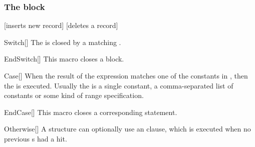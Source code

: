 \documentclass[a4paper, 11pt]{article}
\begin{document}
\subsubsection{The  block}

\begin{tcblisting}{}
    \begin{algorithmic}
            [inserts new record]
            \EndCase
            [deletes a record]
            \EndCase
            \Otherwise
            \EndOtherwise
        \EndSwitch
    \end{algorithmic}
\end{tcblisting}


\begin{macro}{Switch}[]
    The  is closed by a matching .

    \BlockOptionsText
\end{macro}

\begin{macro}{EndSwitch}[]
    This macro closes a  block.

    \MacroOptionsText
\end{macro}

\begin{macro}{Case}[]
    When the result of the  expression matches one of the constants in , then the  is executed. Usually the  is a single constant, a comma-separated list of constants or some kind of range specification.

    \BlockOptionsText
\end{macro}

\begin{macro}{EndCase}[]
    This macro closes a corresponding  statement.

    \MacroOptionsText
\end{macro}

\begin{macro}{Otherwise}[]
    A  structure can optionally use an  clause, which is executed when no previous s had a hit.

    \BlockOptionsText
\end{macro}
\end{document}
